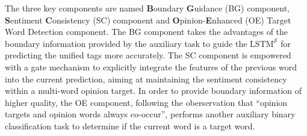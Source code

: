 \documentclass[letterpaper]{article} \usepackage{aaai19}  \usepackage{times}  \usepackage{helvet}  \usepackage{courier}  \usepackage{url}  \usepackage{graphicx}  \frenchspacing  \setlength{\pdfpagewidth}{8.5in}  \setlength{\pdfpageheight}{11in}
\begin{document}
The three key components are named \textbf{B}oundary \textbf{G}uidance (BG) component, \textbf{S}entiment \textbf{C}onsistency (SC) component and \textbf{O}pinion-\textbf{E}nhanced (OE) Target Word Detection component. The BG component takes the advantages of the boundary information provided by the auxiliary task to guide the $\text{LSTM}^{\mathcal{S}}$ for predicting the unified tags more accurately. The SC component is empowered with a gate mechanism to explicitly integrate the features of the previous word into the current prediction, aiming at maintaining the sentiment consistency within a multi-word opinion target. In order to provide boundary information of higher quality, the OE component, following the oberservation that ``opinion targets and opinion words always co-occur'', performs another auxiliary binary classification task to determine if the current word is a target word.
\end{document}
